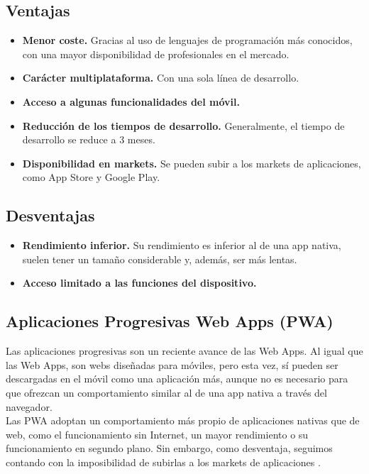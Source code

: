 \subsection*{Ventajas}
\begin{itemize}
	\item \textbf{Menor coste.} Gracias al uso de lenguajes de programación más conocidos, con una mayor disponibilidad de profesionales en el mercado.
	\item \textbf{Carácter multiplataforma.} Con una sola línea de desarrollo.
	\item \textbf{Acceso a algunas funcionalidades del móvil.}
	\item \textbf{Reducción de los tiempos de desarrollo.} Generalmente, el tiempo de desarrollo se reduce a 3 meses.
	\item \textbf{Disponibilidad en markets.} Se pueden subir a los markets de aplicaciones, como App Store y Google Play.
\end{itemize}

\subsection*{Desventajas}
\begin{itemize}
	\item \textbf{Rendimiento inferior.} Su rendimiento es inferior al de una app nativa, suelen tener un tamaño considerable y, además, ser más lentas.
	\item \textbf{Acceso limitado a las funciones del dispositivo.}
\end{itemize}

\subsection{Aplicaciones Progresivas Web Apps (PWA)}

Las aplicaciones progresivas son un reciente avance de las Web Apps. Al igual que las Web Apps, son webs diseñadas para móviles, pero esta vez, sí pueden ser descargadas en el móvil como una aplicación más, aunque no es necesario para que ofrezcan un comportamiento similar al de una app nativa a través del navegador. \\

Las PWA adoptan un comportamiento más propio de aplicaciones nativas que de web, como el funcionamiento sin Internet, un mayor rendimiento o su funcionamiento en segundo plano. Sin embargo, como desventaja, seguimos contando con la imposibilidad de subirlas a los markets de aplicaciones \cite{IM1}. \\

